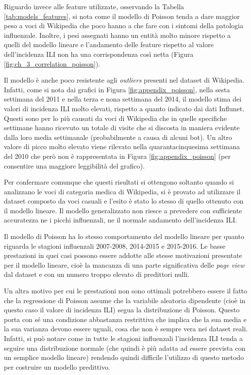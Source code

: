 Riguardo invece alle feature utilizzate, osservando la Tabella \ref{tab:models_features}, si nota come il modello di 
Poisson tenda a dare maggior peso a voci di Wikipedia che poco hanno a che fare con i sintomi della patologia influenzale. 
Inoltre, i pesi assegnati hanno un entità molto minore rispetto a quelli del modello lineare e  
l'andamento delle feature rispetto al valore dell'incidenza ILI non ha una corrispondenza così netta (Figura 
\ref{fig:ch_3_correlation_poisson}).
\bigskip

Il modello è anche poco resistente agli \textit{outliers} presenti nel dataset di Wikipedia. Infatti, come si nota dai 
grafici in Figura \ref{fig:appendix_poisson}, nella sesta settimana del 2011 e
nella terza e nona settimana del 2014, il modello stima dei valori di incidenza ILI molto elevati, rispetto a quanto indicato 
dai dati Influnet. Questi sono per lo più causati da voci di Wikipedia che in quelle specifiche settimane hanno ricevuto un 
totale di visite che si discosta in maniera evidente dalla loro media settimanale (probabilmente a causa di alcuni bot).
Un altro valore di picco molto elevato viene rilevato nella quarantacinquesima settimana del 2010 che però non è 
rappresentata in Figura \ref{fig:appendix_poisson} (per consentire una maggiore leggibilità del grafico).
\bigskip 

Per confermare comunque che questi risultati si ottengono soltanto quando si analizzano le voci di categoria medica di 
Wikipedia, si è provato ad utilizzare il dataset composto da voci casuali e l'esito è stato lo stesso di quello ottenuto 
con il modello lineare. Il modello generalizzato non riesce a prevedere con sufficiente accuratezza ne i picchi influenzali, 
ne il normale andamento dell'incidenza ILI. 
\bigskip

Il modello di Poisson ha lo stesso comportamento del modello lineare per quanto riguarda le stagioni influenzali 2007-2008, 
2014-2015 e 2015-2016. Le basse prestazioni in quei casi possono essere addotte alle stesse motivazioni presentate per il 
modello lineare, cioè la mancanza di una parte significativa delle \textit{page view} dal dataset e con un numero troppo 
elevato di predittori nulli.
\bigskip

Un altra motivo per cui le prestazioni non sono ottimali potrebbero essere il fatto che la regressione di Poisson assume 
che la variabile aleatoria dipendente (cioè in questo caso il valore di incidenza ILI) segua la distribuzione di Poisson. 
Questo porta con sé una condizione abbastanza restrittiva che implica che la sua media e la sua varianza devono essere 
uguali, cosa che non è sempre vera nei dataset reali. Infatti, si può notare come in tutte le stagioni influenzali 
l'incidenza ILI tenda a seguire una distribuzione normale (che quindi è più adatta ad essere prevista con un semplice modello 
lineare) rendendo quindi difficile l'utilizzo di questo metodo per costruire un modello predittivo.
\bigskip

